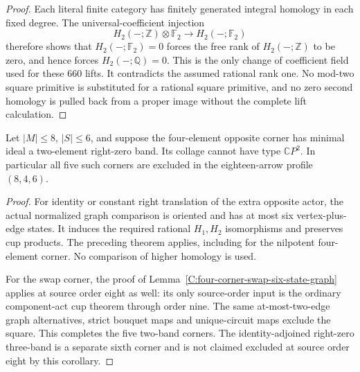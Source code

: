 \begin{proof}
Each literal finite category has finitely generated integral
homology in each fixed degree.  The universal-coefficient
injection
\[
 H_2(-;\mathbb Z)\otimes\mathbb F_2
       \longrightarrow H_2(-;\mathbb F_2)
\]
therefore shows that $H_2(-;\mathbb F_2)=0$ forces the free
rank of $H_2(-;\mathbb Z)$ to be zero, and hence forces
$H_2(-;\mathbb Q)=0$.  This is the only change of coefficient
field used for these $660$ lifts.  It contradicts the assumed
rational rank one.  No mod-two square primitive is substituted
for a rational square primitive, and no zero second homology
is pulled back from a proper image without the complete lift
calculation.
\end{proof}

\begin{corollary}
\label{C:eight-four-six-two-band-excluded}
Let $|M|\leq8$, $|S|\leq6$, and suppose the four-element
opposite corner has minimal ideal a two-element right-zero band.
Its collage cannot have type $\mathbb CP^2$.
In particular all five such corners are excluded in the
eighteen-arrow profile $(8,4,6)$.
\end{corollary}
\begin{proof}
For identity or constant right translation of the extra opposite
actor, the actual normalized graph comparison is oriented and
has at most six vertex-plus-edge states.  It induces the required
rational $H_1,H_2$ isomorphisms and preserves cup products.
The preceding theorem applies, including for the nilpotent
four-element corner.  No comparison of higher homology is used.

For the swap corner, the proof of
Lemma~\ref{C:four-corner-swap-six-state-graph} applies at source
order eight as well: its only source-order input is the ordinary
component-act cup theorem through order nine.  The same
at-most-two-edge graph alternatives, strict bouquet maps and
unique-circuit maps exclude the square.  This completes the
five two-band corners.  The identity-adjoined right-zero
three-band is a separate sixth corner and is not claimed
excluded at source order eight by this corollary.
\end{proof}
